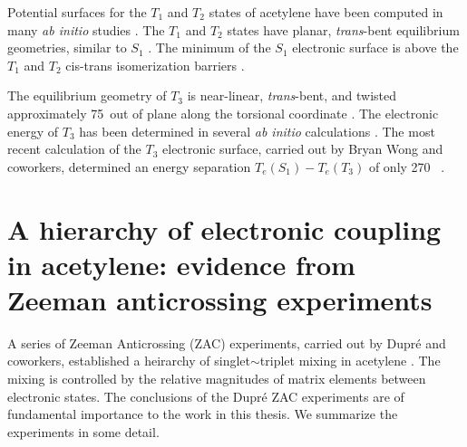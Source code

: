 Potential surfaces for the $T_1$ and $T_2$ states of acetylene have
been computed in many \emph{ab initio} studies \cite{demoulin75,
  wetmore78, lischka86, yamaguchi93, cui96, cui97, malsch98, dallos02,
  ventura03}.  The $T_1$ and $T_2$ states have planar,
\emph{trans}-bent equilibrium geometries, similar to $S_1$
\cite{demoulin75, wetmore78, yamaguchi93}.  The minimum of the $S_1$
electronic surface is above the $T_1$ and $T_2$ cis-trans
isomerization barriers \cite{vacek96, sherrill96}.

The equilibrium geometry of $T_3$ is near-linear, \emph{trans}-bent,
and twisted approximately 75\degrees\ out of plane along the torsional
coordinate \cite{ventura03, thom07}.  The electronic energy of $T_3$
has been determined in several \emph{ab initio} calculations
\cite{malsch98, ventura03, thom07}.
The most recent calculation of the $T_3$ electronic surface, carried
out by Bryan Wong and coworkers, determined an energy separation
$T_e(S_1)-T_e(T_3)$ of only 270 \rcm\ \cite{thom07}.






\section{A hierarchy of electronic coupling in acetylene: evidence from
  Zeeman anticrossing experiments}

A series of Zeeman Anticrossing (ZAC) experiments, carried out by
Dupr\'{e} and coworkers, established a heirarchy of
singlet$\sim$triplet mixing in acetylene \cite{dupre91, dupre93,
  dupre95a, dupre95b}.  The mixing is controlled by the relative
magnitudes of matrix elements between electronic states.  The
conclusions of the Dupr\'{e} ZAC experiments are of fundamental
importance to the work in this thesis.  We summarize the experiments
in some detail.

